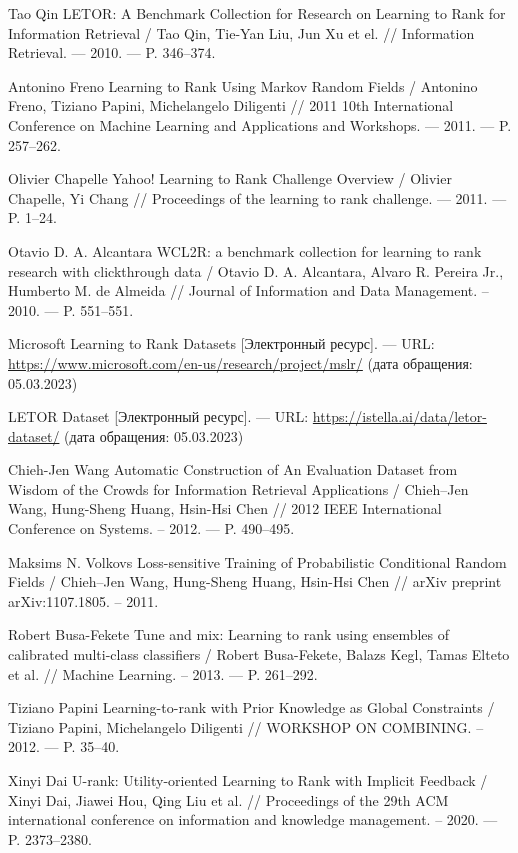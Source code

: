 \begin{thebibliography}{}
 Tao Qin LETOR: A Benchmark Collection for Research on
Learning to Rank for Information Retrieval / Tao Qin, Tie-Yan Liu, Jun Xu et el. // Information Retrieval. --- 2010. --- P. 346--374.

 Antonino Freno Learning to Rank Using Markov Random Fields / Antonino Freno, Tiziano Papini, Michelangelo Diligenti // 2011 10th International Conference on Machine Learning and Applications and Workshops. --- 2011. --- P. 257--262.

 Olivier Chapelle Yahoo! Learning to Rank Challenge Overview / Olivier Chapelle, Yi Chang  // Proceedings of the learning to rank challenge. --- 2011. --- P. 1--24.

 Otavio D. A. Alcantara WCL2R: a benchmark collection for learning to rank research with clickthrough data / Otavio D. A. Alcantara, Alvaro R. Pereira Jr., Humberto M. de Almeida // Journal of Information and Data Management. – 2010. --- P. 551--551.

 Microsoft Learning to Rank Datasets [Электронный ресурс]. --- URL: \url{https://www.microsoft.com/en-us/research/project/mslr/} (дата обращения: 05.03.2023)

 LETOR Dataset [Электронный ресурс]. --- URL: \url{https://istella.ai/data/letor-dataset/} (дата обращения: 05.03.2023)

 Chieh-Jen Wang Automatic Construction of An Evaluation Dataset from Wisdom of the Crowds for Information Retrieval Applications / Chieh--Jen Wang, Hung-Sheng Huang, Hsin-Hsi Chen // 2012 IEEE International Conference on Systems. – 2012. --- P. 490--495.

 Maksims N. Volkovs Loss-sensitive Training of Probabilistic Conditional Random Fields / Chieh--Jen Wang, Hung-Sheng Huang, Hsin-Hsi Chen // arXiv preprint arXiv:1107.1805. – 2011.

 Robert Busa-Fekete Tune and mix: Learning to rank using ensembles of calibrated multi-class classifiers / Robert Busa-Fekete, Balazs Kegl, Tamas Elteto et al. // Machine Learning. – 2013. --- P. 261--292.

 Tiziano Papini Learning-to-rank with Prior Knowledge as Global Constraints / Tiziano Papini, Michelangelo Diligenti // WORKSHOP ON COMBINING. – 2012. --- P. 35--40.

 Xinyi Dai U-rank: Utility-oriented Learning to Rank with Implicit Feedback / Xinyi Dai, Jiawei Hou, Qing Liu et al. // Proceedings of the 29th ACM international conference on information and knowledge management. – 2020. --- P. 2373--2380.


\end{thebibliography}
